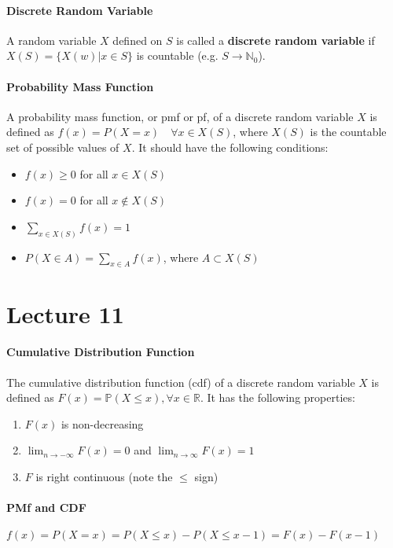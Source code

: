 \documentclass[10pt,letter]{article}
\begin{document}
\paragraph{Discrete Random Variable}
A random variable $X$ defined on $S$ is called a \textbf{discrete random variable} if $X(S)=\{X(w)|x\in S\}$ is countable (e.g. $S\rightarrow \mathbb{N}_0$). 
\paragraph{Probability Mass Function}
A probability mass function, or pmf or pf, of a discrete random variable $X$ is defined as $f(x)=P(X=x)\quad\forall x\in X(S)$, where $X(S)$ is the countable set of possible values of $X$. It should have the following conditions: \begin{itemize}
    \item $f(x)\geq0$ for all $x\in X(S)$
    \item $f(x)=0$ for all $x\notin X(S)$ 
    \item $\sum_{x\in X(S)}f(x)=1$ 
    \item $P(X\in A)=\sum_{x\in A}f(x)$, where $A\subset X(S)$
\end{itemize}
 
\section*{Lecture 11}
\paragraph{Cumulative Distribution Function}
The cumulative distribution function (cdf) of a discrete random variable $X$ is defined as $F(x)=\mathbb{P}(X\leq x), \forall x\in\mathbb{R}$. It has the following properties: \begin{enumerate}
    \item $F(x)$ is non-decreasing
    \item $\lim_{n\rightarrow-\infty}F(x)=0$ and $\lim_{n\rightarrow\infty}F(x)=1$ 
    \item $F$ is right continuous (note the $\leq$ sign)
\end{enumerate}

\paragraph{PMf and CDF}
$f(x)=P(X=x)=P(X\leq x)-P(X\leq x-1)=F(x)-F(x-1)$ 
\end{document}
